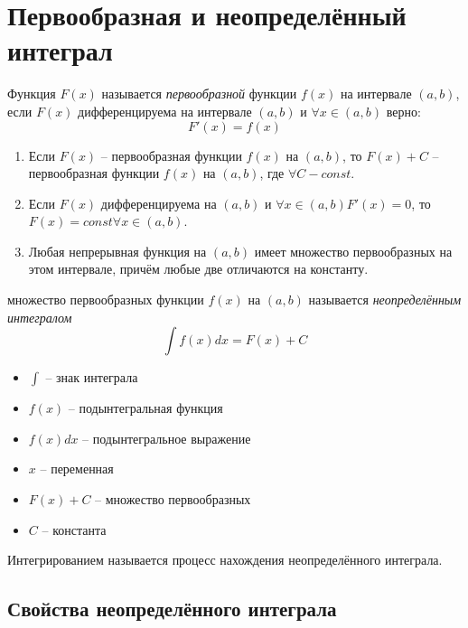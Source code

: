\section{Первообразная и неопределённый интеграл}

\begin{definition}[Первообразная]
    Функция $F(x)$ называется \textit{первообразной} функции $f(x)$ на интервале $(a, b)$, если $F(x)$ дифференцируема на интервале $(a, b)$ и $\forall x \in (a, b)$ верно: \[
        F'(x) = f(x)
    \]
\end{definition}

\begin{enumerate}
    \item Если $F(x)$ -- первообразная функции $f(x)$ на $(a, b)$, то $F(x) + C$ -- первообразная функции $f(x)$ на $(a, b)$, где $\forall C - const$.
    \item  Если $F(x)$ дифференцируема на $(a, b)$ и $\forall x \in (a, b) F'(x) = 0$, то $F(x) = const \forall x \in (a, b)$.
    \item Любая непрерывная функция на  $(a, b)$  имеет множество первообразных на этом интервале, причём любые две отличаются на константу.
\end{enumerate}

\begin{definition}
    множество первообразных функции $f(x)$ на $(a, b)$ называется \textit{неопределённым интегралом} \[
        \int f(x)dx = F(x) + C
    \]
\end{definition}

\begin{itemize}
    \item $\int$ -- знак интеграла
    \item $f(x)$ -- подынтегральная функция
    \item $f(x)dx$ -- подынтегральное выражение
    \item $x$ -- переменная
    \item $F(x) + C$ -- множество первообразных
    \item $C$ -- константа
\end{itemize}

\begin{definition}[Интегрирование]
    Интегрированием называется процесс нахождения неопределённого интеграла.
\end{definition}

\subsection{Свойства неопределённого интеграла}

